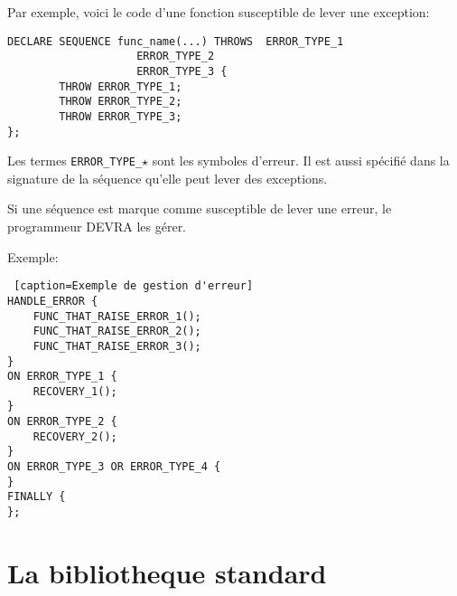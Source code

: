 \documentclass{rtxreport}
\begin{document}
Par exemple, voici le code d'une fonction susceptible de lever une exception:

\begin{lstlisting}[caption=Exemple d'une fonction levant une exception]
DECLARE SEQUENCE func_name(...) THROWS	ERROR_TYPE_1
					ERROR_TYPE_2
					ERROR_TYPE_3 {
		THROW ERROR_TYPE_1;
		THROW ERROR_TYPE_2;
		THROW ERROR_TYPE_3;
};
\end{lstlisting}

Les termes \texttt{ERROR\_TYPE\_$\star$} sont les symboles d'erreur.
Il est aussi spécifié dans la signature de la séquence qu'elle peut lever des
exceptions.

Si une séquence est marque comme susceptible de lever une erreur, le
programmeur DEVRA les gérer.


Exemple:

\begin{lstlisting} [caption=Exemple de gestion d'erreur]
HANDLE_ERROR {
	FUNC_THAT_RAISE_ERROR_1();
	FUNC_THAT_RAISE_ERROR_2();
	FUNC_THAT_RAISE_ERROR_3();
}
ON ERROR_TYPE_1 {
	RECOVERY_1();
}
ON ERROR_TYPE_2 {
	RECOVERY_2();
}
ON ERROR_TYPE_3 OR ERROR_TYPE_4 {
}
FINALLY {
};
\end{lstlisting}

\chapter{La bibliotheque standard}
\end{document}
